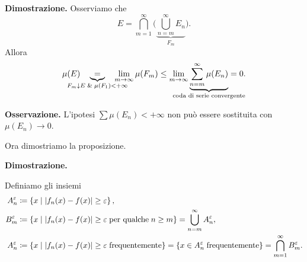\documentclass[a4paper, 12pt]{report}
\begin{document}
\textbf{Dimostrazione.}
Osserviamo che
%
$$
E = \bigcap_{m=1}^\infty \Big( \underbrace{\bigcup_{n=m}^\infty E_n}_{F_m} \Big).
$$
%
Allora
%
$$
\mu(E) \quad \underbrace{=}_{\mathclap{F_m \downarrow E \; \& \; \mu(F_1) < +\infty}} \quad  \lim_{m \to \infty} \mu(F_m) \leq \lim_{m \to \infty} \underbrace{\sum_{n=m}^{\infty} \mu(E_n)}_{\mathclap{\text{coda di serie convergente}}} = 0.
$$
%

\textbf{Osservazione.}
L'ipotesi $\sum \mu(E_n) < +\infty$ non può essere sostituita con $\mu(E_n) \to 0$.

Ora dimostriamo la proposizione.

\textbf{Dimostrazione.}

Definiamo gli insiemi
\begin{align*}
A_n^\varepsilon & \coloneqq \left\{ x \;\middle|\; \left| f_n(x) - f(x) \right| \geq \varepsilon \right\}, \\
B_m^\varepsilon & \coloneqq \left\{ x \;\middle|\; \left| f_n(x) - f(x) \right| \geq \varepsilon \; \text{per qualche} \; n \geq m\right\} = \bigcup_{n = m}^\infty A_n^\varepsilon, \\
A_n^\varepsilon & \coloneqq \left\{ x \;\middle|\; \left| f_n(x) - f(x) \right| \geq \varepsilon \; \text{frequentemente}  \right\} = \left\{ x \in A_n^\varepsilon \; \text{frequentemente}  \right\} = \bigcap_{m = 1}^\infty B_m^\varepsilon.
\end{align*}
\end{document}
